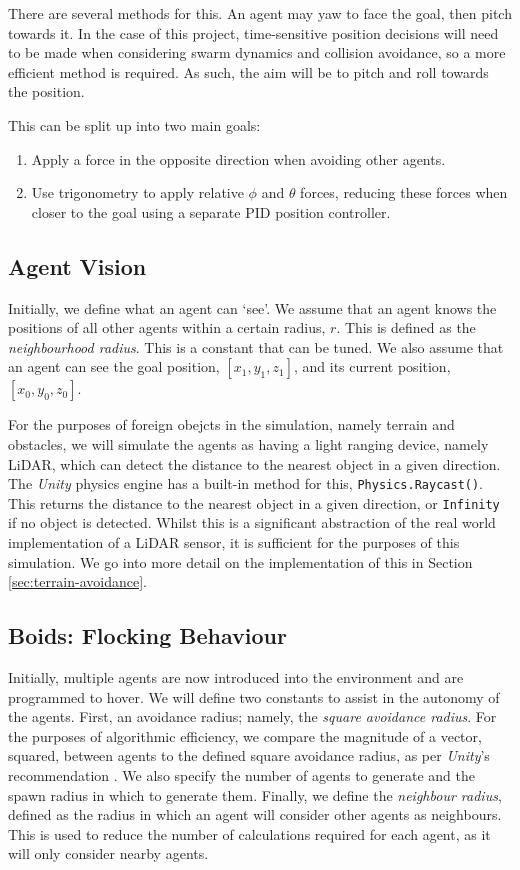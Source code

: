 \documentclass{article}
\begin{document}
There are several methods for this. An agent may yaw to face the goal, then pitch towards it. In the case of this project, time-sensitive position decisions will need to be made when considering swarm dynamics and collision avoidance, so a more efficient method is required. As such, the aim will be to pitch and roll towards the position.

This can be split up into two main goals:
\begin{enumerate}
    \item Apply a force in the opposite direction when avoiding other agents.
    \item Use trigonometry to apply relative $\phi$ and $\theta$ forces, reducing these forces when closer to the goal using a separate PID position controller.
\end{enumerate}

\subsection{Agent Vision}
\label{sec:vision}
Initially, we define what an agent can `see'. We assume that an agent knows the positions of all other agents within a certain radius, $r$. This is defined as the \emph{neighbourhood radius}. This is a constant that can be tuned. We also assume that an agent can see the goal position, $[x_1,y_1,z_1]$, and its current position, $[x_0,y_0,z_0]$.

For the purposes of foreign obejcts in the simulation, namely terrain and obstacles, we will simulate the agents as having a light ranging device, namely LiDAR, which can detect the distance to the nearest object in a given direction. The \emph{Unity} physics engine has a built-in method for this, \verb|Physics.Raycast()|. This returns the distance to the nearest object in a given direction, or \verb|Infinity| if no object is detected. Whilst this is a significant abstraction of the real world implementation of a LiDAR sensor, it is sufficient for the purposes of this simulation. We go into more detail on the implementation of this in Section \ref{sec:terrain-avoidance}.

\subsection{Boids: Flocking Behaviour}

Initially, multiple agents are now introduced into the environment and are programmed to hover. We will define two constants to assist in the autonomy of the agents. First, an avoidance radius; namely, the \emph{square avoidance radius}. For the purposes of algorithmic efficiency, we compare the magnitude of a vector, squared, between agents to the defined square avoidance radius, as per \emph{Unity}'s recommendation \cite{unity}. We also specify the number of agents to generate and the spawn radius in which to generate them. Finally, we define the \emph{neighbour radius}, defined as the radius in which an agent will consider other agents as neighbours. This is used to reduce the number of calculations required for each agent, as it will only consider nearby agents.
\end{document}
